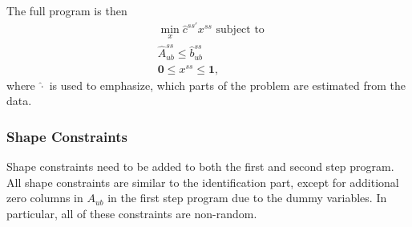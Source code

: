 \documentclass[12pt,a4paper,english]{article} %
\numberwithin{equation}{section}
\theoremstyle{definition}
\theoremstyle{remark}
\theoremstyle{plain}
\begin{document}
The full program is then
\begin{align}
  & \min_x \hat{c}^{ss'}x^{ss} \text{ subject to }\\
  & \hat{A}_{ub}^{ss} \leq \hat{b}_{ub}^{ss} \\
  & \mathbf{0} \leq x^{ss} \leq \mathbf{1},
\end{align}
where $\hat{\cdot}$ is used to emphasize, which parts of the problem are estimated from the data.

\subsubsection{Shape Constraints}
Shape constraints need to be added to both the first and second step program.
All shape constraints are similar to the identification part, except for additional zero columns in $A_{ub}$ in the first step program due to the dummy variables.
In particular, all of these constraints are non-random.




\end{document}
